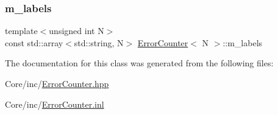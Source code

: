 \mbox{\label{class_error_counter_ac2f34a61c4c38ece96df182dd4b5c5ca}} 
\subsubsection{\texorpdfstring{m\+\_\+labels}{m\_labels}}
{\footnotesize\ttfamily template$<$unsigned int N$>$ \\
const std\+::array$<$std\+::string, N$>$ \hyperlink{class_error_counter}{Error\+Counter}$<$ N $>$\+::m\+\_\+labels\hspace{0.3cm}{\ttfamily [private]}}



The documentation for this class was generated from the following files\+:\begin{DoxyCompactItemize}
\item 
Core/inc/\hyperlink{_error_counter_8hpp}{Error\+Counter.\+hpp}\item 
Core/inc/\hyperlink{_error_counter_8inl}{Error\+Counter.\+inl}\end{DoxyCompactItemize}

